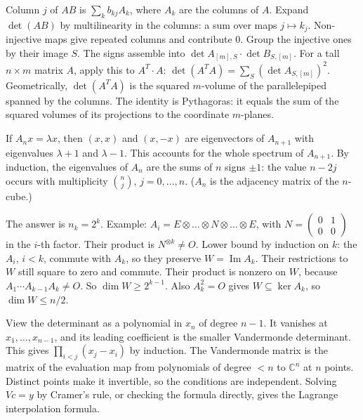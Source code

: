\documentclass[11pt,a4paper]{article}
\begin{document}

Column \(j\) of \(AB\) is \(\sum_kb_{kj}A_k\), where \(A_k\) are the columns of \(A\). Expand \(\det(AB)\) by multilinearity in the columns: a sum over maps \(j\mapsto k_j\).
Non-injective maps give repeated columns and contribute \(0\). Group the injective ones by their image \(S\). The signs assemble into \(\det A_{[m],S}\cdot\det B_{S,[m]}\).
For a tall \(n\times m\) matrix \(A\), apply this to \(A^T\cdot A\): \(\det(A^TA)=\sum_S(\det A_{S,[m]})^2\). Geometrically, \(\det(A^TA)\) is the squared \(m\)-volume of the parallelepiped spanned by the columns. The identity is Pythagoras: it equals the sum of the squared volumes of its projections to the coordinate \(m\)-planes.

If \(A_nx=\lambda x\), then \((x,x)\) and \((x,-x)\) are eigenvectors of \(A_{n+1}\) with eigenvalues \(\lambda+1\) and \(\lambda-1\). This accounts for the whole spectrum of \(A_{n+1}\).
By induction, the eigenvalues of \(A_n\) are the sums of \(n\) signs \(\pm1\): the value \(n-2j\) occurs with multiplicity \(\binom nj\), \(j=0,\dots,n\). (\(A_n\) is the adjacency matrix of the \(n\)-cube.)

The answer is \(n_k=2^k\). Example: \(A_i=E\otimes\dots\otimes N\otimes\dots\otimes E\), with \(N=\begin{pmatrix}0&1\\0&0\end{pmatrix}\) in the \(i\)-th factor. Their product is \(N^{\otimes k}\ne O\).
Lower bound by induction on \(k\): the \(A_i\), \(i<k\), commute with \(A_k\), so they preserve \(W=\operatorname{Im}A_k\). Their restrictions to \(W\) still square to zero and commute. Their product is nonzero on \(W\), because \(A_1\cdots A_{k-1}A_k\ne O\).
So \(\dim W\ge2^{k-1}\). Also \(A_k^2=O\) gives \(W\subseteq\ker A_k\), so \(\dim W\le n/2\).

View the determinant as a polynomial in \(x_n\) of degree \(n-1\). It vanishes at \(x_1,\dots,x_{n-1}\), and its leading coefficient is the smaller Vandermonde determinant. This gives \(\prod_{i<j}(x_j-x_i)\) by induction.
The Vandermonde matrix is the matrix of the evaluation map from polynomials of degree \(<n\) to \(\mathbb C^n\) at \(n\) points. Distinct points make it invertible, so the conditions are independent. Solving \(Vc=y\) by Cramer's rule, or checking the formula directly, gives the Lagrange interpolation formula.
\end{document}
